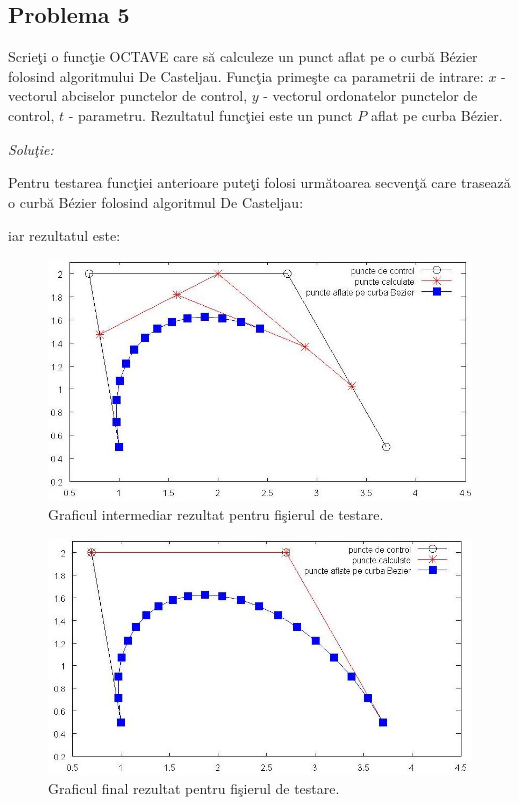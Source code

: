 \documentclass{exam}
\newcommand{\octavescript}[2]{
	
}
\begin{document}
\subsection{Problema 5}

Scrieţi o funcţie OCTAVE care să calculeze un punct aflat pe o curbă B\'{e}zier folosind algoritmului De Casteljau. Funcţia primeşte ca parametrii de intrare: $x$ - vectorul abciselor punctelor de control, $y$ - vectorul ordonatelor punctelor de control, $t$ - parametru. Rezultatul funcţiei este un punct $P$ aflat pe curba B\'{e}zier.

\textit{Soluţie:}

\octavescript{./src/Casteljau.m}{Algoritmului De Casteljau.}

Pentru testarea funcţiei anterioare puteţi folosi următoarea secvenţă care trasează o curbă B\'{e}zier folosind algoritmul De Casteljau:

\octavescript{./src/BezierCasteljau.m}{Fişier de testare.}

iar rezultatul este:

\begin{figure}[ht]
	\centering
	\includegraphics[width=165mm]{./img/Bezierintermed.jpg}
	\caption{Graficul intermediar rezultat pentru fişierul de testare.}
	\label{bezi}
\end{figure}

\begin{figure}[ht]
	\centering
	\includegraphics[width=165mm]{./img/Bezier.jpg}
	\caption{Graficul final rezultat pentru fişierul de testare.}
	\label{bezi}
\end{figure}
\end{document}
